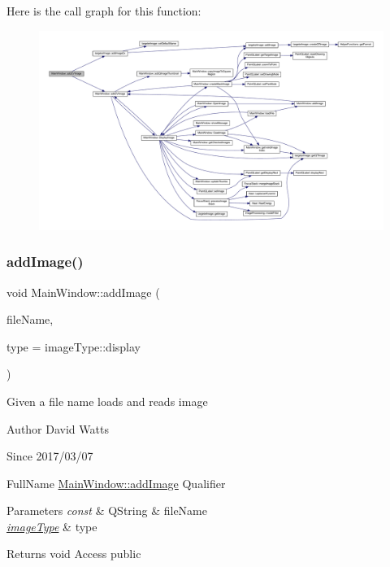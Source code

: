 Here is the call graph for this function\+:
\nopagebreak
\begin{figure}[H]
\begin{center}
\leavevmode
\includegraphics[width=350pt]{class_main_window_ab87edc0e4b2fb3e4fb4df14a8872cbb4_cgraph}
\end{center}
\end{figure}
\mbox{\label{class_main_window_ab4d1f49d192d3641e0da68b5a69d014a}} 
\subsubsection{\texorpdfstring{add\+Image()}{addImage()}}
{\footnotesize\ttfamily void Main\+Window\+::add\+Image (\begin{DoxyParamCaption}\item[{const Q\+String \&}]{file\+Name,  }\item[{image\+Type\+::image\+Type}]{type = {\ttfamily imageType\+:\+:display} }\end{DoxyParamCaption})}

Given a file name loads and reads image

\begin{DoxyAuthor}{Author}
David Watts 
\end{DoxyAuthor}
\begin{DoxySince}{Since}
2017/03/07
\end{DoxySince}
Full\+Name \hyperlink{class_main_window_ab4d1f49d192d3641e0da68b5a69d014a}{Main\+Window\+::add\+Image} Qualifier 
\begin{DoxyParams}{Parameters}
{\em const} & Q\+String \& file\+Name \\
\hline
{\em \hyperlink{namespaceimage_type}{image\+Type}} & type \\
\hline
\end{DoxyParams}
\begin{DoxyReturn}{Returns}
void Access public 
\end{DoxyReturn}


